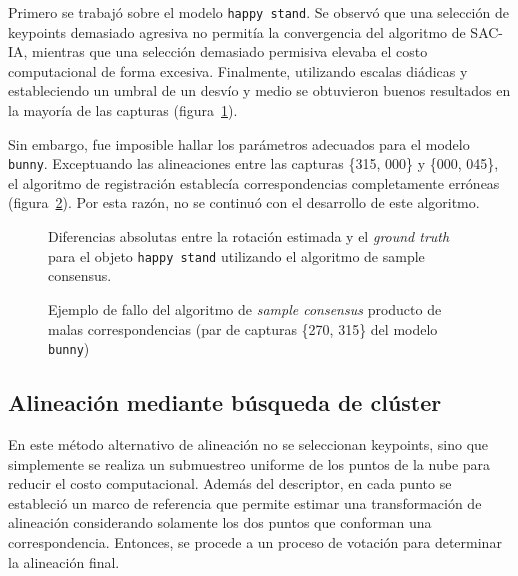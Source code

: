 			Primero se trabajó sobre el modelo \texttt{happy stand}.
			Se observó que una selección de keypoints demasiado agresiva no permitía la convergencia del algoritmo de SAC-IA,
			mientras que una selección demasiado permisiva elevaba el costo computacional de forma excesiva.
			Finalmente, utilizando escalas diádicas y estableciendo un umbral de un desvío y medio
			se obtuvieron buenos resultados en la mayoría de las capturas (figura~\ref{fig:dif_rot_happy_sac}).

			Sin embargo, fue imposible hallar los parámetros adecuados para el modelo \texttt{bunny}.
			Exceptuando las alineaciones entre las capturas \{315, 000\} y \{000, 045\},
			el algoritmo de registración establecía correspondencias completamente erróneas (figura~\ref{fig:align_sac}).
			Por esta razón, no se continuó con el desarrollo de este algoritmo.

			\begin{figure}
				
				\caption[Diferencias en la rotación estimada para el objeto \texttt{happy stand} (SAC-IA)]
				{\label{fig:dif_rot_happy_sac}Diferencias absolutas entre la rotación estimada y el \emph{ground truth} para el objeto \texttt{happy stand}
				utilizando el algoritmo de sample consensus.}
			\end{figure}

			\begin{figure}
				\caption[Fallo en el algoritmo de \emph{sample consensus}]{\label{fig:align_sac}Ejemplo de fallo del algoritmo de \emph{sample consensus} producto de malas correspondencias
				(par de capturas \{270, 315\} del modelo \texttt{bunny})}
			\end{figure}


	\subsection{Alineación mediante búsqueda de clúster}
		En este método alternativo de alineación no se seleccionan keypoints,
		sino que simplemente se realiza un submuestreo uniforme de los puntos de la nube
		para reducir el costo computacional.
		Además del descriptor, en cada punto se estableció un marco de referencia
		que permite estimar una transformación de alineación
		considerando solamente los dos puntos que conforman una correspondencia\cite{ISS}.
		Entonces, se procede a un proceso de votación para determinar la alineación final.

